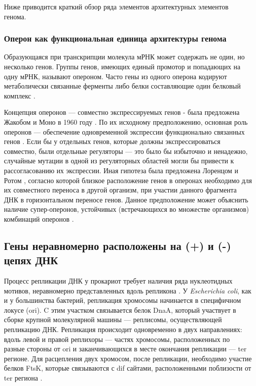 Ниже приводится краткий обзор ряда элементов архитектурных элементов генома.

\subsubsection{Оперон как функциональная единица архитектуры генома}
Образующаяся при транскрипции молекула мРНК может содержать не один, но несколько генов. Группы генов, имеющих единый промотор и попадающих на одну мРНК, называют опероном. Часто гены из одного оперона кодируют метаболически связанные ферменты \cite{zheng2002computational} либо белки составляющие один белковый комплекс \cite{wells2016operon}.

Концепция оперонов --- совместно экспрессируемых генов - была предложена Жакобом и Моно в 1960 году \cite{jacob1960loperon}. По их исходному предположению, основная роль оперонов --- обеспечение одновременной экспрессии функционально связанных генов \cite{jacob1961genetic}. Если бы у отдельных генов, которые должны экспрессироваться совместно, были отдельные регуляторы --- это было бы избыточно и ненадежно, случайные мутации в одной из регуляторных областей могли бы привести к рассогласованию их экспрессии. Иная гипотеза была предложена Лоренцом и Ротом \cite{lawrence1996selfish}, согласно которой близкое расположение генов в оперонах необходимо для их совместного переноса в другой организм, при участии данного фрагмента ДНК в горизонтальном переносе генов. Данное предположение может объяснить наличие супер-оперонов, устойчивых (встречающихся во множестве организмов) комбинаций оперонов \cite{rogozin2002connected}. 

\subsection{Гены неравномерно расположены на (+) и (-) цепях ДНК}
Процесс репликации ДНК у прокариот требует наличия ряда нуклеотидных мотивов, неравномерно представленных вдоль репликона \cite{touzain2011dna}. У \textit{Escherichia coli}, как и у большинства бактерий, репликация хромосомы начинается в специфичном локусе (ori). C этим участком связывается белок DnaA, который участвует в сборке крупной молекулярной машины --- реплисомы, осуществляющей репликацию ДНК. Репликация происходит одновременно в двух направлениях: вдоль левой и правой реплихоры --- частях хромосомы, расположенных по разные стороны от ori и заканчивающихся в месте окончания репликации --- ter регионе. Для расцепления двух хромосом, после репликации, необходимо участие белков FtsK, которые связываются с dif сайтами, расположенными поблизости от ter региона \cite{bigot2007ftsk}.

